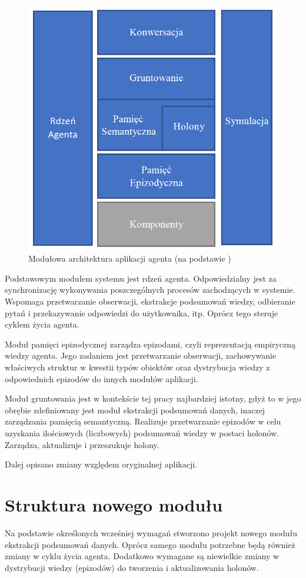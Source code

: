 \begin{figure}  
	\centering\includegraphics[width=.6\textwidth]{img/moduly}
	\caption{Modułowa architektura aplikacji agenta (na podstawie \cite{raport})}
	\label{rys:moduly}
\end{figure}

Podstawowym modułem systemu jest rdzeń agenta. Odpowiedzialny jest za synchronizację wykonywania poszczególnych procesów zachodzących w systemie. Wspomaga przetwarzanie obserwacji, ekstrakcje podsumowań wiedzy, odbieranie pytań i przekazywanie odpowiedzi do użytkownika, itp. Oprócz tego steruje cyklem życia agenta.

Moduł pamięci epizodycznej zarządza epizodami, czyli reprezentacją empiryczną wiedzy agenta. Jego zadaniem jest przetwarzanie obserwacji, zachowywanie właściwych struktur w kwestii typów obiektów oraz dystrybucja wiedzy z odpowiednich epizodów do innych modułów aplikacji.

Moduł gruntowania jest w kontekście tej pracy najbardziej istotny, gdyż to w jego obrębie zdefiniowany jest moduł ekstrakcji podsumowań danych, inaczej zarządzania pamięcią semantyczną. Realizuje przetwarzanie epizodów w celu uzyskania ilościowych (liczbowych) podsumowań wiedzy w postaci holonów. Zarządza, aktualizuje i przeszukuje holony.

Dalej opisano zmiany względem oryginalnej aplikacji.

\section{Struktura nowego modułu}

Na podstawie określonych wcześniej wymagań stworzono projekt nowego modułu ekstrakcji podsumowań danych. Oprócz samego modułu potrzebne będą również zmiany w cyklu życia agenta. Dodatkowo wymagane są niewielkie zmiany w dystrybucji wiedzy (epizodów) do tworzenia i aktualizowania holonów. 

